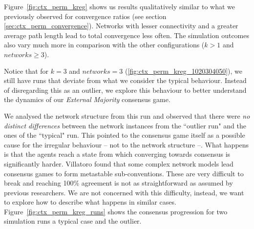 \documentclass[preprint,number]{elsarticle}
\begin{document}
      \noindent Figure~\ref{fig:ctx_perm_kreg} shows us results qualitatively similar to what we
      previously observed for convergence ratios (see section
      \ref{sec:ctx_perm_convergence}). Networks with lesser connectivity and a greater average path
      length lead to total convergence less often. The simulation outcomes also vary much more in
      comparison with the other configurations ($k>1$ and $networks \ge 3$).

      Notice that for $k=3$ and $networks=3$ (\ref{fig:ctx_perm_kreg_1020304050}), we still have
      runs that deviate from what we consider the typical behaviour. Instead of disregarding this as
      an outlier, we explore this behaviour to better understand the dynamics of our
      \textit{External Majority} consensus game.

      We analysed the network structure from this run and observed that there were \textit{no
        distinct differences} between the network instances from the ``outlier run" and the ones of
      the ``typical" run. This pointed to the consensus game itself as a possible cause for the
      irregular behaviour -- not to the network structure --. What happens is that the agents reach
      a state from which converging towards consensus is significantly harder. Villatoro
      \cite{Villatoro2013} found that some complex network models lead consensus games to form
      metastable sub-conventions. These are very difficult to break and reaching 100\% agreement is
      not as straightforward as assumed by previous researchers. We are not concerned with this
      difficulty, instead, we want to explore how to describe what happens in similar
      cases. Figure~\ref{fig:ctx_perm_kreg_runs} shows the consensus progression for two simulation
      runs a typical case and the outlier.
\end{document}
